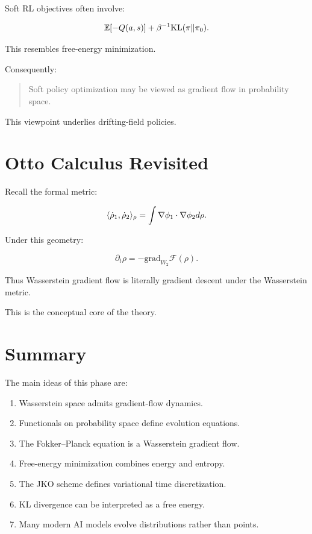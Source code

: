 Soft RL objectives often involve:

\[
\mathbb E[-Q(a,s)]
+
\beta^{-1}\mathrm{KL}(\pi\|\pi_0).
\]

This resembles free-energy minimization.

Consequently:

\begin{quote}
Soft policy optimization may be viewed as gradient flow in probability space.
\end{quote}

This viewpoint underlies drifting-field policies.

\section{Otto Calculus Revisited}

Recall the formal metric:

\[
\langle \dot \rho_1,\dot \rho_2 \rangle_\rho
=
\int \nabla \phi_1 \cdot \nabla \phi_2 d\rho.
\]

Under this geometry:

\[
\partial_t \rho
=
-\mathrm{grad}_{W_2}\mathcal F(\rho).
\]

Thus Wasserstein gradient flow is literally gradient descent under the Wasserstein metric.

This is the conceptual core of the theory.

\section{Summary}

The main ideas of this phase are:

\begin{enumerate}[label=(\arabic*)]
    \item Wasserstein space admits gradient-flow dynamics.
    \item Functionals on probability space define evolution equations.
    \item The Fokker--Planck equation is a Wasserstein gradient flow.
    \item Free-energy minimization combines energy and entropy.
    \item The JKO scheme defines variational time discretization.
    \item KL divergence can be interpreted as a free energy.
    \item Many modern AI models evolve distributions rather than points.
\end{enumerate}

